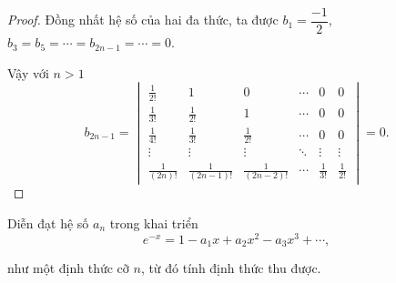 \begin{proof}
    Đồng nhất hệ số của hai đa thức, ta được $b_{1} = \dfrac{-1}{2}$, $b_{3} = b_{5} = \cdots = b_{2n-1} = \cdots = 0$.
    
    Vậy với $n > 1$
    \[
        b_{2n-1} =
        \begin{vmatrix}
            \frac{1}{2!}    & 1                 & 0                 & \cdots & 0            & 0            \\
            \frac{1}{3!}    & \frac{1}{2!}      & 1                 & \cdots & 0            & 0            \\
            \frac{1}{4!}    & \frac{1}{3!}      & \frac{1}{2!}      & \cdots & 0            & 0            \\
            \vdots          & \vdots            & \vdots            & \ddots & \vdots       & \vdots       \\
            \frac{1}{(2n)!} & \frac{1}{(2n-1)!} & \frac{1}{(2n-2)!} & \cdots & \frac{1}{3!} & \frac{1}{2!}
        \end{vmatrix}
        = 0.
    \]
\end{proof}

\begin{exercise}
    Diễn đạt hệ số $a_{n}$ trong khai triển
    \[
        e^{-x} = 1 - a_{1}x + a_{2}x^{2} - a_{3}x^{3} + \cdots ,
    \]
    
    như một định thức cỡ $n$, từ đó tính định thức thu được.
\end{exercise}


